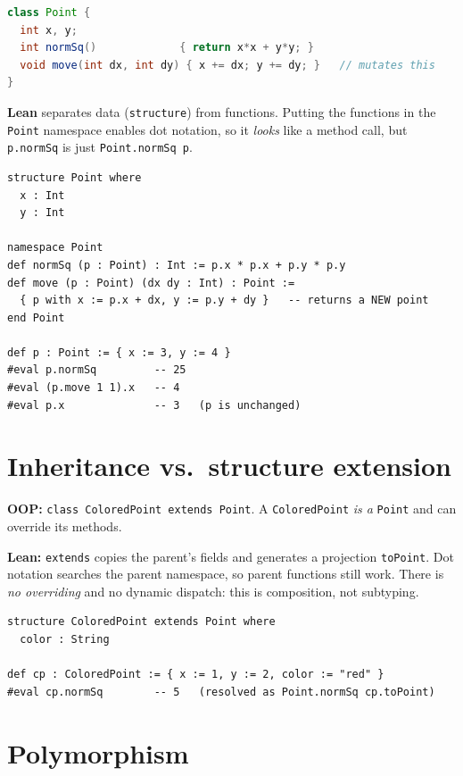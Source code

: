 \documentclass[11pt,a4paper]{article}
\newcommand{\lean}[1]{\lstinline[language=Lean]{#1}}
\begin{document}
\begin{lstlisting}[language=Java]
class Point {
  int x, y;
  int normSq()             { return x*x + y*y; }
  void move(int dx, int dy) { x += dx; y += dy; }   // mutates this
}
\end{lstlisting}

\textbf{Lean} separates data (\lean{structure}) from functions. Putting the
functions in the \lean{Point} namespace enables dot notation, so it
\emph{looks} like a method call, but \lean{p.normSq} is just
\lean{Point.normSq p}.

\begin{lstlisting}[language=Lean]
structure Point where
  x : Int
  y : Int

namespace Point
def normSq (p : Point) : Int := p.x * p.x + p.y * p.y
def move (p : Point) (dx dy : Int) : Point :=
  { p with x := p.x + dx, y := p.y + dy }   -- returns a NEW point
end Point

def p : Point := { x := 3, y := 4 }
#eval p.normSq         -- 25
#eval (p.move 1 1).x   -- 4
#eval p.x              -- 3   (p is unchanged)
\end{lstlisting}

\section{Inheritance vs.\ structure extension}

\textbf{OOP:} \texttt{class ColoredPoint extends Point}. A
\texttt{ColoredPoint} \emph{is a} \texttt{Point} and can override its
methods.

\textbf{Lean:} \lean{extends} copies the parent's fields and generates a
projection \lean{toPoint}. Dot notation searches the parent namespace, so
parent functions still work. There is \emph{no overriding} and no dynamic
dispatch: this is composition, not subtyping.

\begin{lstlisting}[language=Lean]
structure ColoredPoint extends Point where
  color : String

def cp : ColoredPoint := { x := 1, y := 2, color := "red" }
#eval cp.normSq        -- 5   (resolved as Point.normSq cp.toPoint)
\end{lstlisting}

\section{Polymorphism}
\end{document}
